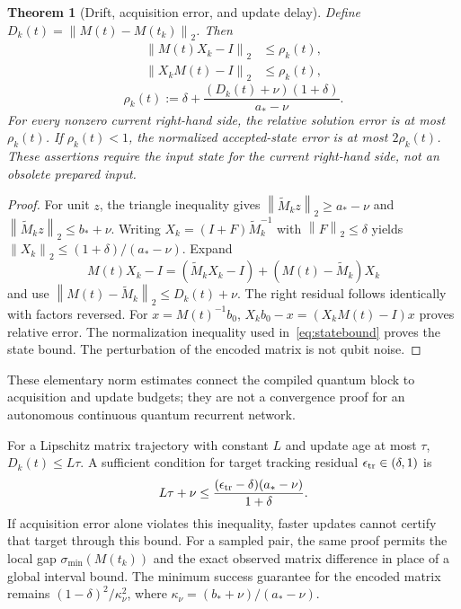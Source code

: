 \documentclass[journal]{IEEEtran}
\newtheorem{theorem}{Theorem}
\newcommand{\norm}[1]{\left\lVert#1\right\rVert}
\begin{document}
\begin{theorem}[Drift, acquisition error, and update delay]
Define $D_k(t)=\norm{M(t)-M(t_k)}_2$. Then
\begin{equation}
 \begin{aligned}
 \norm{M(t)X_k-I}_2&\leq\rho_k(t),\\
 \norm{X_kM(t)-I}_2&\leq\rho_k(t),
 \end{aligned}
 \label{eq:heldbound}
\end{equation}
\begin{equation}
 \rho_k(t):=\delta+
 \frac{(D_k(t)+\nu)(1+\delta)}{a_*-\nu}.
 \label{eq:rho}
\end{equation}
For every nonzero current right-hand side, the relative solution error is
at most $\rho_k(t)$. If $\rho_k(t)<1$, the normalized accepted-state
error is at most $2\rho_k(t)$. These assertions require the input state
for the current right-hand side, not an obsolete prepared input.
\end{theorem}
\begin{proof}
For unit $z$, the triangle inequality gives
$\norm{\widetilde M_kz}_2\geq a_*-\nu$ and
$\norm{\widetilde M_kz}_2\leq b_*+\nu$. Writing
$X_k=(I+F)\widetilde M_k^{-1}$ with $\norm F_2\leq\delta$ yields
$\norm{X_k}_2\leq(1+\delta)/(a_*-\nu)$. Expand
\[
 M(t)X_k-I=(\widetilde M_kX_k-I)
                +(M(t)-\widetilde M_k)X_k
\]
and use $\norm{M(t)-\widetilde M_k}_2\leq D_k(t)+\nu$.
The right residual follows identically with factors reversed. For
$x=M(t)^{-1}b_0$, $X_kb_0-x=(X_kM(t)-I)x$ proves relative error.
The normalization inequality used in~\eqref{eq:statebound} proves the
state bound. The perturbation of the encoded matrix is not qubit noise.
\end{proof}
These elementary norm estimates connect the compiled quantum block to
acquisition and update budgets; they are not a convergence proof for an
autonomous continuous quantum recurrent network.

For a Lipschitz matrix trajectory with constant $L$ and update age at
most $\tau$, $D_k(t)\leq L\tau$. A sufficient condition for target
tracking residual $\epsilon_{\rm tr}\in(\delta,1)$ is
\begin{equation}
 L\tau+\nu\leq
 \frac{(\epsilon_{\rm tr}-\delta)(a_*-\nu)}{1+\delta}.
 \label{eq:updaterule}
\end{equation}
If acquisition error alone violates this inequality, faster updates
cannot certify that target through this bound. For a sampled pair,
the same proof permits the local gap $\sigma_{\min}(M(t_k))$ and the
exact observed matrix difference in place of a global interval bound.
The minimum success guarantee for the encoded matrix remains
$(1-\delta)^2/\kappa_\nu^2$, where
$\kappa_\nu=(b_*+\nu)/(a_*-\nu)$.
\end{document}
